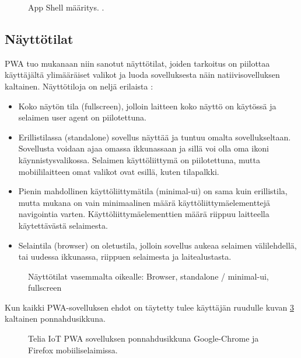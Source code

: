 \documentclass{tktltiki}
\begin{document}
\begin{figure}[h]
\begin{center}
\caption{App Shell määritys. \cite{Google4}. }
\label{App shell}
\end{center}
\end{figure}
\clearpage


\subsection{Näyttötilat}

PWA tuo mukanaan niin sanotut näyttötilat, joiden tarkoitus on piilottaa käyttäjältä ylimääräiset valikot ja luoda sovelluksesta näin natiivisovelluksen kaltainen. Näyttötiloja on neljä erilaista \cite{Mozilla}:

\begin{itemize}
  \item Koko näytön tila (fullscreen), jolloin laitteen koko näyttö on käytössä ja selaimen user agent on piilotettuna.
  \item Erillistilassa (standalone) sovellus näyttää ja tuntuu omalta sovellukseltaan. Sovellusta voidaan ajaa omassa ikkunassaan ja sillä voi olla oma ikoni käynnistysvalikossa. Selaimen käyttöliittymä on piilotettuna, mutta mobiililaitteen omat valikot ovat esillä, kuten tilapalkki. 
  \item Pienin mahdollinen käyttöliittymätila (minimal-ui) on sama kuin erillistila, mutta mukana on vain minimaalinen määrä käyttöliittymäelementtejä navigointia varten. Käyttöliittymäelementtien määrä riippuu laitteella käytettävästä selaimesta. 
  \item Selaintila (browser) on oletustila, jolloin sovellus aukeaa selaimen välilehdellä, tai uudessa ikkunassa, riippuen selaimesta ja laitealustasta. 
\end{itemize}

\begin{figure}[h]
\begin{center}
\caption{Näyttötilat vasemmalta oikealle: Browser, standalone / minimal-ui, fullscreen}
\label{Näyttötilat}
\end{center}
\end{figure}
\clearpage

Kun kaikki PWA-sovelluksen ehdot on täytetty tulee käyttäjän ruudulle kuvan \ref{asennusbanneri} kaltainen ponnahdusikkuna.

\begin{figure}[!ht]
\begin{center}
\caption{Telia IoT PWA sovelluksen ponnahdusikkuna Google-Chrome ja Firefox mobiiliselaimissa.}
\label{asennusbanneri}
\end{center}
\end{figure}
\end{document}
